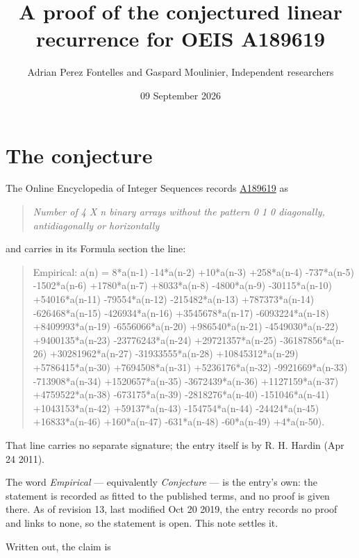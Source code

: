 \documentclass[11pt]{article}
\title{A proof of the conjectured linear recurrence for OEIS A189619}
\author{Adrian Perez Fontelles and Gaspard Moulinier, Independent researchers}
\date{09 September 2026}
\theoremstyle{definition}
\begin{document}
\maketitle
\section{The conjecture}

The Online Encyclopedia of Integer Sequences records \href{https://oeis.org/A189619}{A189619} as

\begin{quote}\itshape Number of 4 X n binary arrays without the pattern 0 1 0 diagonally, antidiagonally or horizontally\end{quote}

and carries in its Formula section the line:

\begin{quote}\ttfamily Empirical: a(n) = 8*a(n-1) -14*a(n-2) +10*a(n-3) +258*a(n-4) -737*a(n-5) -1502*a(n-6) +1780*a(n-7) +8033*a(n-8) -4800*a(n-9) -30115*a(n-10) +54016*a(n-11) -79554*a(n-12) -215482*a(n-13) +787373*a(n-14) -626468*a(n-15) -426934*a(n-16) +3545678*a(n-17) -6093224*a(n-18) +8409993*a(n-19) -6556066*a(n-20) +986540*a(n-21) -4549030*a(n-22) +9400135*a(n-23) -23776243*a(n-24) +29721357*a(n-25) -36187856*a(n-26) +30281962*a(n-27) -31933555*a(n-28) +10845312*a(n-29) +5786415*a(n-30) +7694508*a(n-31) +5236176*a(n-32) -9921669*a(n-33) -713908*a(n-34) +1520657*a(n-35) -3672439*a(n-36) +1127159*a(n-37) +4759522*a(n-38) -673175*a(n-39) -2818276*a(n-40) -151046*a(n-41) +1043153*a(n-42) +59137*a(n-43) -154754*a(n-44) -24424*a(n-45) +16833*a(n-46) +160*a(n-47) -631*a(n-48) -60*a(n-49) +4*a(n-50).\end{quote}

That line carries no separate signature; the entry itself is by R. H. Hardin (Apr 24 2011).

The word {\itshape Empirical} --- equivalently {\itshape Conjecture} --- is the entry's own: the statement is recorded as fitted to the published terms, and no proof is given there. As of revision 13, last modified Oct 20 2019, the entry records no proof and links to none, so the statement is open. This note settles it.

Written out, the claim is
\end{document}
